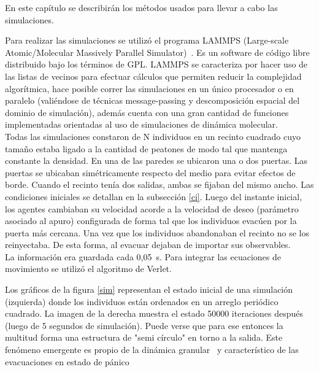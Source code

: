 \label{simulaciones}

En este capítulo se describirán los métodos usados para llevar a cabo las simulaciones.

Para realizar las simulaciones se utilizó el programa LAMMPS (Large-scale Atomic/Molecular Massively Parallel Simulator)~\cite{plimpton}.
Es un software de código libre distribuido bajo los términos de GPL. 
LAMMPS se caracteriza por hacer uso de las listas de vecinos para efectuar cálculos que permiten reducir la 
complejidad algorítmica, hace posible correr las simulaciones en un único procesador o en paralelo (valiéndose de técnicas message-passing y descomposición espacial del dominio de simulación), además cuenta con una gran cantidad de funciones implementadas orientadas al uso de simulaciones de dinámica molecular. \\

Todas las simulaciones constaron de N individuos en un recinto cuadrado cuyo tamaño estaba ligado a la cantidad de
peatones de modo tal que mantenga constante la densidad. En una de las paredes se ubicaron una o dos puertas. Las puertas se ubicaban simétricamente respecto del medio para evitar efectos de borde. Cuando el recinto tenía dos salidas, ambas se fijaban del mismo ancho.
Las condiciones iniciales se detallan en la subsección \ref{ci}.  Luego del instante inicial, los agentes cambiaban su velocidad acorde a la velocidad de deseo (parámetro asociado al apuro) configurada de forma tal que los individuos evacúen por la puerta más cercana. Una vez que los individuos abandonaban el recinto no se los reinyectaba. De esta forma, al evacuar dejaban de importar sus observables. \\

La información era guardada cada 0,05~s. Para integrar las ecuaciones de movimiento se utilizó el algoritmo de Verlet. 

Los gráficos de la figura \ref{sim} representan el estado inicial de una simulación (izquierda) donde los individuos están ordenados en un arreglo periódico cuadrado. La imagen de la derecha muestra el estado 50000 iteraciones después (luego de 5 segundos de simulación). Puede verse que para ese entonces la multitud forma una estructura de "semi círculo" en torno a la salida. Este fenómeno emergente es propio de la dinámica granular~\cite{To} y característico de las evacuaciones en estado de pánico~\cite{Helbing1}  

